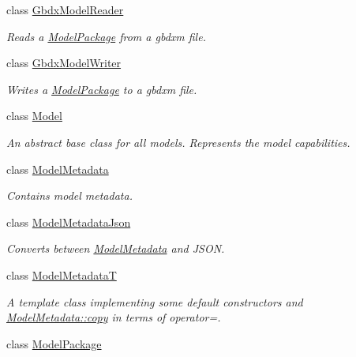 \begin{DoxyCompactItemize}
class \hyperlink{classdg_1_1deepcore_1_1classification_1_1_gbdx_model_reader}{Gbdx\+Model\+Reader}
\begin{DoxyCompactList}\small\item\em Reads a \hyperlink{classdg_1_1deepcore_1_1classification_1_1_model_package}{Model\+Package} from a gbdxm file. \end{DoxyCompactList}\item 
class \hyperlink{classdg_1_1deepcore_1_1classification_1_1_gbdx_model_writer}{Gbdx\+Model\+Writer}
\begin{DoxyCompactList}\small\item\em Writes a \hyperlink{classdg_1_1deepcore_1_1classification_1_1_model_package}{Model\+Package} to a gbdxm file. \end{DoxyCompactList}\item 
class \hyperlink{classdg_1_1deepcore_1_1classification_1_1_model}{Model}
\begin{DoxyCompactList}\small\item\em An abstract base class for all models. Represents the model capabilities. \end{DoxyCompactList}\item 
class \hyperlink{classdg_1_1deepcore_1_1classification_1_1_model_metadata}{Model\+Metadata}
\begin{DoxyCompactList}\small\item\em Contains model metadata. \end{DoxyCompactList}\item 
class \hyperlink{classdg_1_1deepcore_1_1classification_1_1_model_metadata_json}{Model\+Metadata\+Json}
\begin{DoxyCompactList}\small\item\em Converts between \hyperlink{classdg_1_1deepcore_1_1classification_1_1_model_metadata}{Model\+Metadata} and J\+S\+ON. \end{DoxyCompactList}\item 
class \hyperlink{classdg_1_1deepcore_1_1classification_1_1_model_metadata_t}{Model\+MetadataT}
\begin{DoxyCompactList}\small\item\em A template class implementing some default constructors and \hyperlink{group___classification_module_ga851d179b56e5c32b25512df0141f3ca2}{Model\+Metadata\+::copy} in terms of operator=. \end{DoxyCompactList}\item 
class \hyperlink{classdg_1_1deepcore_1_1classification_1_1_model_package}{Model\+Package}

\end{DoxyCompactItemize}
